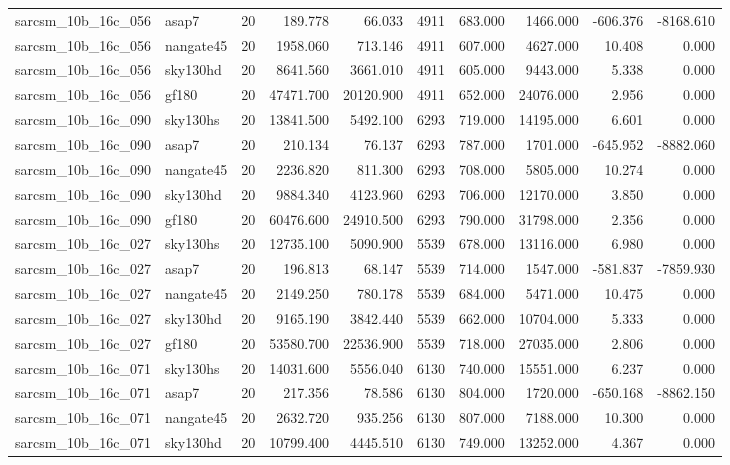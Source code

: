 \begin{longtable}{llrrrrrrrr}
sarcsm\_10b\_16c\_056 & asap7 & 20 & 189.778 & 66.033 & 4911 & 683.000 & 1466.000 & -606.376 & -8168.610 \\
sarcsm\_10b\_16c\_056 & nangate45 & 20 & 1958.060 & 713.146 & 4911 & 607.000 & 4627.000 & 10.408 & 0.000 \\
sarcsm\_10b\_16c\_056 & sky130hd & 20 & 8641.560 & 3661.010 & 4911 & 605.000 & 9443.000 & 5.338 & 0.000 \\
sarcsm\_10b\_16c\_056 & gf180 & 20 & 47471.700 & 20120.900 & 4911 & 652.000 & 24076.000 & 2.956 & 0.000 \\
sarcsm\_10b\_16c\_090 & sky130hs & 20 & 13841.500 & 5492.100 & 6293 & 719.000 & 14195.000 & 6.601 & 0.000 \\
sarcsm\_10b\_16c\_090 & asap7 & 20 & 210.134 & 76.137 & 6293 & 787.000 & 1701.000 & -645.952 & -8882.060 \\
sarcsm\_10b\_16c\_090 & nangate45 & 20 & 2236.820 & 811.300 & 6293 & 708.000 & 5805.000 & 10.274 & 0.000 \\
sarcsm\_10b\_16c\_090 & sky130hd & 20 & 9884.340 & 4123.960 & 6293 & 706.000 & 12170.000 & 3.850 & 0.000 \\
sarcsm\_10b\_16c\_090 & gf180 & 20 & 60476.600 & 24910.500 & 6293 & 790.000 & 31798.000 & 2.356 & 0.000 \\
sarcsm\_10b\_16c\_027 & sky130hs & 20 & 12735.100 & 5090.900 & 5539 & 678.000 & 13116.000 & 6.980 & 0.000 \\
sarcsm\_10b\_16c\_027 & asap7 & 20 & 196.813 & 68.147 & 5539 & 714.000 & 1547.000 & -581.837 & -7859.930 \\
sarcsm\_10b\_16c\_027 & nangate45 & 20 & 2149.250 & 780.178 & 5539 & 684.000 & 5471.000 & 10.475 & 0.000 \\
sarcsm\_10b\_16c\_027 & sky130hd & 20 & 9165.190 & 3842.440 & 5539 & 662.000 & 10704.000 & 5.333 & 0.000 \\
sarcsm\_10b\_16c\_027 & gf180 & 20 & 53580.700 & 22536.900 & 5539 & 718.000 & 27035.000 & 2.806 & 0.000 \\
sarcsm\_10b\_16c\_071 & sky130hs & 20 & 14031.600 & 5556.040 & 6130 & 740.000 & 15551.000 & 6.237 & 0.000 \\
sarcsm\_10b\_16c\_071 & asap7 & 20 & 217.356 & 78.586 & 6130 & 804.000 & 1720.000 & -650.168 & -8862.150 \\
sarcsm\_10b\_16c\_071 & nangate45 & 20 & 2632.720 & 935.256 & 6130 & 807.000 & 7188.000 & 10.300 & 0.000 \\
sarcsm\_10b\_16c\_071 & sky130hd & 20 & 10799.400 & 4445.510 & 6130 & 749.000 & 13252.000 & 4.367 & 0.000 \\

\end{longtable}
